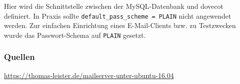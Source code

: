 Hier wird die Schnittstelle zwischen der MySQL-Datenbank und dovecot definiert. In Praxis sollte \verb|default_pass_scheme = PLAIN| nicht angewendet werden. Zur einfachen Einrichtung eines E-Mail-Clients bzw. zu Testzwecken wurde das Passwort-Schema auf \verb|PLAIN| gesetzt. 



\subsubsection{Quellen}
\url{https://thomas-leister.de/mailserver-unter-ubuntu-16.04}


